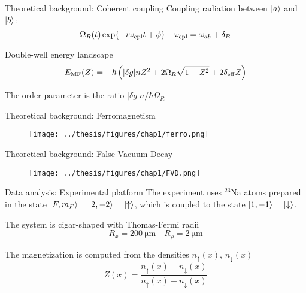 \documentclass[aspectratio=169]{beamer}
\begin{document}

\begin{frame}{Theoretical background: Coherent coupling}
  Coupling radiation between $\ket{a}$ and $\ket{b}$:
  \[
      \Omega_R(t)\exp{-i\omega_{\rm cpl}t+\phi} \quad \omega_{\rm cpl} = \omega_{ab} + \delta_B
  \]

  Double-well energy landscape
  \begin{equation*}
      E_{\rm MF}(Z) = -\hbar\left(|\delta g|n Z^2 + 2\Omega_R \sqrt{1-Z^2} + 2\delta_{\rm eff} Z\right)
      \label{eq:E_MF}
  \end{equation*}

  The order parameter is the ratio $|\delta g|n/\hbar\Omega_R$
\end{frame}

\begin{frame}{Theoretical background: Ferromagnetism}
  \begin{figure}
      \centering
      \texttt{[image: ../thesis/figures/chap1/ferro.png]}
  \end{figure}
\end{frame}

\begin{frame}{Theoretical background: False Vacuum Decay}
  \begin{figure}
      \centering
      \texttt{[image: ../thesis/figures/chap1/FVD.png]}
  \end{figure}    
\end{frame}

\begin{frame}{Data analysis: Experimental platform}
  The experiment uses $^{23}$Na atoms prepared in the state $\ket{F,m_F} = \ket{2, -2} = \ket{\uparrow}$, which is coupled to the state $\ket{1, -1} = \ket{\downarrow}$.

  The system is cigar-shaped with Thomas-Fermi radii 
  \begin{equation*}
      R_x = 200\ \unit{\micro\meter} \quad R_\rho = 2\ \unit{\micro\meter}
  \end{equation*}

  The magnetization is computed from the densities $n_\uparrow(x)$, $n_\downarrow(x)$
  \begin{equation*}
      Z(x) = \frac{n_\uparrow(x) - n_\downarrow(x)}{n_\uparrow(x) + n_\downarrow(x)}
  \end{equation*}
\end{frame}
\end{document}
